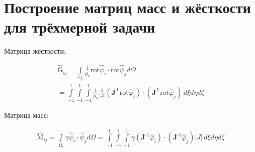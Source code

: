 \section{Построение матриц масс и жёсткости для трёхмерной задачи}

Матрица жёсткости:

\begin{equation} \label{eq_1_11}
\begin{gathered}
	\hat{\text{G}}_{ij} = \int \limits_{\Omega_e} \frac{1}{\mu_0} \text{rot}  \hat{\text{$\psi$}}_i \cdot \text{rot} \hat{\text{$\psi$}}_j d \Omega = \\ = \int \limits_{-1}^1 \int \limits_{-1}^1 \int \limits_{-1}^1 \frac{1}{\mu_0} \frac{1}{|J|} \left( \textbf{J}^{\text{T}} \text{rot} \hat{\varphi}_i \right) \cdot \left( \textbf{J}^{\text{T}} \text{rot} \hat{\varphi}_j \right) \, d \xi d \eta d \zeta
\end{gathered}
\end{equation}

Матрица масс:

\begin{equation} \label{eq_1_12}
	\begin{gathered}
		\hat{\text{M}}_{ij} = \int \limits_{\Omega_e} \gamma  \hat{\text{$\psi$}}_i \cdot \hat{\text{$\psi$}}_j d \Omega = \int \limits_{-1}^1 \int \limits_{-1}^1 \int \limits_{-1}^1 \gamma  \left( \textbf{J}^{\text{-1}} \hat{\varphi}_i \right) \cdot \left( \textbf{J}^{\text{-1}} \hat{\varphi}_j \right) |J| \, d \xi d \eta d \zeta
	\end{gathered}
\end{equation}
